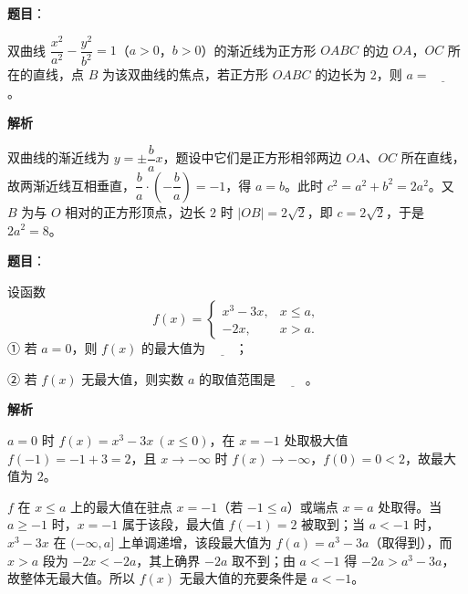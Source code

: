 \begin{answer}

\textbf{题目}：

双曲线 \(\dfrac{x^{2}}{a^{2}}-\dfrac{y^{2}}{b^{2}}=1\)（\(a>0\)，\(b>0\)）的渐近线为正方形 \(OABC\) 的边 \(OA\)，\(OC\) 所在的直线，点 \(B\) 为该双曲线的焦点，若正方形 \(OABC\) 的边长为 \(2\)，则 \(a=\underline{\qquad}\)。

\textbf{解析}

双曲线的渐近线为 \(y=\pm\dfrac ba x\)，题设中它们是正方形相邻两边 \(OA\)、\(OC\) 所在直线，故两渐近线互相垂直，\(\dfrac ba\cdot\left(-\dfrac ba\right)=-1\)，得 \(a=b\)。此时 \(c^2=a^2+b^2=2a^2\)。又 \(B\) 为与 \(O\) 相对的正方形顶点，边长 \(2\) 时 \(|OB|=2\sqrt2\)，即 \(c=2\sqrt2\)，于是 \(2a^2=8\)。


\end{answer}
\begin{answer}

\textbf{题目}：

设函数
\nopagebreak[4]
\[
f(x)=\begin{cases}
x^{3}-3x, & x\leqslant a,\\
-2x, & x>a.
\end{cases}
\]
① 若 \(a=0\)，则 \(f(x)\) 的最大值为 \(\underline{\qquad}\)；

② 若 \(f(x)\) 无最大值，则实数 \(a\) 的取值范围是 \(\underline{\qquad}\)。

\textbf{解析}


\(a=0\) 时 \(f(x)=x^3-3x\ (x\leqslant0)\)，在 \(x=-1\) 处取极大值 \(f(-1)=-1+3=2\)，且 \(x\to-\infty\) 时 \(f(x)\to-\infty\)，\(f(0)=0<2\)，故最大值为 \(2\)。


\(f\) 在 \(x\leqslant a\) 上的最大值在驻点 \(x=-1\)（若 \(-1\leqslant a\)）或端点 \(x=a\) 处取得。当 \(a\geqslant-1\) 时，\(x=-1\) 属于该段，最大值 \(f(-1)=2\) 被取到；当 \(a<-1\) 时，\(x^3-3x\) 在 \((-\infty,a]\) 上单调递增，该段最大值为 \(f(a)=a^3-3a\)（取得到），而 \(x>a\) 段为 \(-2x<-2a\)，其上确界 \(-2a\) 取不到；由 \(a<-1\) 得 \(-2a>a^3-3a\)，故整体无最大值。所以 \(f(x)\) 无最大值的充要条件是 \(a<-1\)。


\end{answer}
